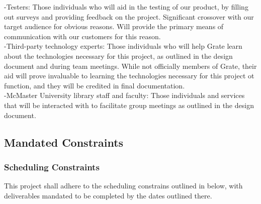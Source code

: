 \documentclass[12pt, titlepage]{article}
\begin{document}
-Testers: Those individuals who will aid in the testing of our product, by 
filling out surveys and providing feedback on the project. Significant crossover 
with our target audience for obvious reasons. Will provide the primary means of 
communication with our customers for this reason.\\

-Third-party technology experts: Those individuals who will help Grate learn 
about the technologies necessary for this project, as outlined in the design 
document and during team meetings. While not officially members of Grate, their 
aid will prove invaluable to learning the technologies necessary for this 
project ot function, and they will be credited in final documentation.\\

-McMaster University library staff and faculty: Those individuals and services 
that will be interacted with to facilitate group meetings as outlined in the 
design document.

\subsection{Mandated Constraints}

\subsubsection{Scheduling Constraints}

This project shall adhere to the scheduling constrains outlined in below, with 
deliverables mandated to be completed by the dates outlined there.
\end{document}

